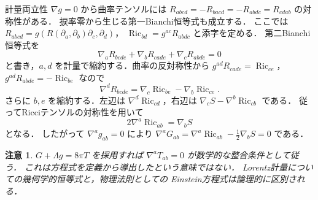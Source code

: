 \documentclass[a5paper,10pt,onecolumn]{jsarticle}
\makeatletter
\theoremstyle{mathnotetheorem}
\newtheorem{remark}[theorem]{注意}
\renewcommand{\proofname}{証明}
\renewenvironment{proof}[1][\proofname]{%
  \par\pushQED{\qed}\normalfont\topsep4\p@\@plus2\p@\relax
  \trivlist\item[\hskip\labelsep\bfseries #1]\ignorespaces
}{\popQED\endtrivlist\@endpefalse}
\makeatother
\begin{document}
\begin{proof}
計量両立性 $\nabla g=0$ から曲率テンソルには
$R_{abcd}=-R_{bacd}=-R_{abdc}=R_{cdab}$ の対称性がある．
捩率零から生じる第一Bianchi恒等式も成立する．
ここでは $R_{abcd}=g(R(\partial_a,\partial_b)\partial_c,\partial_d)$，
$\operatorname{Ric}_{bd}=g^{ac}R_{abdc}$ と添字を定める．
第二Bianchi恒等式を
\[
 \nabla_a R_{bcde}+\nabla_bR_{cade}
 +\nabla_cR_{abde}=0
\]
と書き，$a,d$ を計量で縮約する．曲率の反対称性から
$g^{ad}R_{cade}=\operatorname{Ric}_{ce}$，
$g^{ad}R_{abde}=-\operatorname{Ric}_{be}$ なので
\[
 \nabla^dR_{bcde}=\nabla_c\operatorname{Ric}_{be}
 -\nabla_b\operatorname{Ric}_{ce}.
\]
さらに $b,e$ を縮約する．左辺は
$\nabla^d\operatorname{Ric}_{cd}$，右辺は
$\nabla_cS-\nabla^b\operatorname{Ric}_{cb}$ である．
従ってRicciテンソルの対称性を用いて
\[
 2\nabla^a\operatorname{Ric}_{ab}=\nabla_bS
\]
となる．
したがって $\nabla^ag_{ab}=0$ により
$\nabla^aG_{ab}=\nabla^a\operatorname{Ric}_{ab}
 -\frac12\nabla_bS=0$ である．
\end{proof}
\begin{remark}
$G+\Lambda g=8\pi T$ を採用すれば
$\nabla^aT_{ab}=0$ が数学的な整合条件として従う．
これは方程式を定義から導出したという意味ではない．
Lorentz計量についての幾何学的恒等式と，物理法則としての
Einstein方程式は論理的に区別される．
\end{remark}
\end{document}

